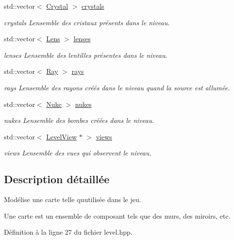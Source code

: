 \begin{DoxyCompactItemize}
std\+::vector$<$ \hyperlink{classCrystal}{Crystal} $>$ \hyperlink{classLevel_a68f233822a00e4ed880ddb180230ff3b}{crystals}
\begin{DoxyCompactList}\small\item\em crystals L\textquotesingle{}ensemble des cristaux présents dans le niveau. \end{DoxyCompactList}\item 
std\+::vector$<$ \hyperlink{classLens}{Lens} $>$ \hyperlink{classLevel_aaeb7900ce3b81586203e8746a47ab3e2}{lenses}
\begin{DoxyCompactList}\small\item\em lenses L\textquotesingle{}ensemble des lentilles présentes dans le niveau. \end{DoxyCompactList}\item 
std\+::vector$<$ \hyperlink{classRay}{Ray} $>$ \hyperlink{classLevel_a316fd189c069c2645f07be3862dc2caf}{rays}
\begin{DoxyCompactList}\small\item\em rays L\textquotesingle{}ensemble des rayons créés dans le niveau quand la source est allumée. \end{DoxyCompactList}\item 
std\+::vector$<$ \hyperlink{classNuke}{Nuke} $>$ \hyperlink{classLevel_a5fece1ffe87935a190ed156456ce410b}{nukes}
\begin{DoxyCompactList}\small\item\em nukes L\textquotesingle{}ensemble des bombes créées dans le niveau. \end{DoxyCompactList}\item 
std\+::vector$<$ \hyperlink{classLevelView}{Level\+View} $\ast$ $>$ \hyperlink{classLevel_a8a01947614ab3998f4c152882c113feb}{views}
\begin{DoxyCompactList}\small\item\em views L\textquotesingle{}ensemble des vues qui observent le niveau. \end{DoxyCompactList}\end{DoxyCompactItemize}


\subsection{Description détaillée}
Modélise une carte telle qu\textquotesingle{}utilisée dans le jeu. 

Une carte est un ensemble de composant tels que des murs, des miroirs, etc. 

Définition à la ligne 27 du fichier level.\+hpp.



